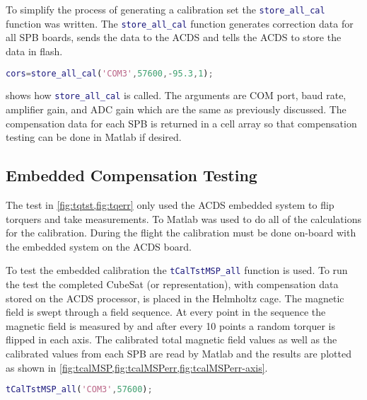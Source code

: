 To simplify the process of generating a calibration set the \lstinline[style=code,language=Matlab]$store_all_cal$ function was written. The \lstinline[style=code,language=Matlab]$store_all_cal$ function generates correction data for all \ac{SPB} boards, sends the data to the \ac{ACDS} and tells the \ac{ACDS} to store the data in flash. 

\begin{lstlisting}[style=code,caption={Generating and sending compensation data to the \ac{ACDS}},label={lst:st-cal},language=Matlab]
cors=store_all_cal('COM3',57600,-95.3,1);
\end{lstlisting}

 shows how \lstinline[style=code,language=Matlab]$store_all_cal$ is called. The arguments are COM port, baud rate, amplifier gain, and \ac{ADC} gain which are the same as previously discussed. The compensation data for each \ac{SPB} is returned in a cell array so that compensation testing can be done in Matlab if desired.

\subsection{Embedded Compensation Testing}

The test in \cref{fig:tqtst,fig:tqerr} only used the \ac{ACDS} embedded system to flip torquers and take measurements. To Matlab was used to do all of the calculations for the calibration. During the flight the calibration must be done on-board with the embedded system on the \ac{ACDS} board.

To test the embedded calibration the \lstinline[style=code,language=Matlab]$tCalTstMSP_all$ function is used. To run the test the completed CubeSat (or representation), with compensation data stored on the \ac{ACDS} processor, is placed in the Helmholtz cage. The magnetic field is swept through a field sequence. At every point in the sequence the magnetic field is measured by and after every 10 points a random torquer is flipped in each axis. The calibrated total magnetic field values as well as the calibrated values from each \ac{SPB} are read by Matlab and the results are plotted as shown in \cref{fig:tcalMSP,fig:tcalMSPerr,fig:tcalMSPerr-axis}.

\begin{lstlisting}[style=code,caption={Testing the on-board calibration},label={lst:st-MSPcal},language=Matlab]
tCalTstMSP_all('COM3',57600);
\end{lstlisting}

